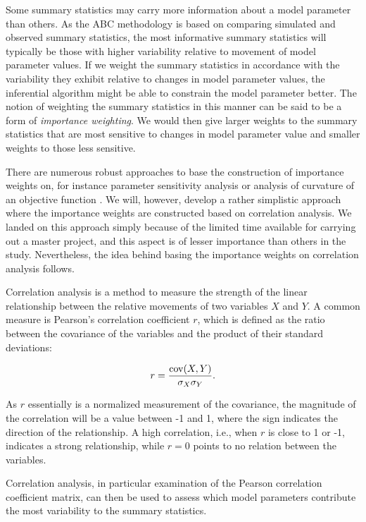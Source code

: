 Some summary statistics may carry more information about a model parameter than others. As the ABC methodology is based on comparing simulated and observed summary statistics, the most informative summary statistics will typically be those with higher variability relative to movement of model parameter values. If we weight the summary statistics in accordance with the variability they exhibit relative to changes in model parameter values, the inferential algorithm might be able to constrain the model parameter better. The notion of weighting the summary statistics in this manner can be said to be a form of \textit{importance weighting}. We would then give larger weights to the summary statistics that are most sensitive to changes in model parameter value and smaller weights to those less sensitive. 

There are numerous robust approaches to base the construction of importance weights on, for instance parameter sensitivity analysis \cite{uncertainpy} or analysis of curvature of an objective function \cite{druckmann}. We will, however, develop a rather simplistic approach where the importance weights are constructed based on correlation analysis. We landed on this approach simply because of the limited time available for carrying out a master project, and this aspect is of lesser importance than others in the study. Nevertheless, the idea behind basing the importance weights on correlation analysis follows. 

Correlation analysis is a method to measure the strength of the linear relationship between the relative movements of two variables $X$ and $Y$. A common measure is Pearson's correlation coefficient $r$, which is defined as the ratio between the covariance of the variables and the product of their standard deviations: 

\begin{equation}
    r = \frac{\mathrm{cov}\qty(X, Y)}{\sigma_X \sigma_Y}.
\end{equation} 

As $r$ essentially is a normalized measurement of the covariance, the magnitude of the correlation will be a value between -1 and 1, where the sign indicates the direction of the relationship. A high correlation, i.e., when $r$ is close to 1 or -1, indicates a strong relationship, while $r=0$ points to no relation between the variables.

Correlation analysis, in particular examination of the Pearson correlation coefficient matrix, can then be used to assess which model parameters contribute the most variability to the summary statistics.


